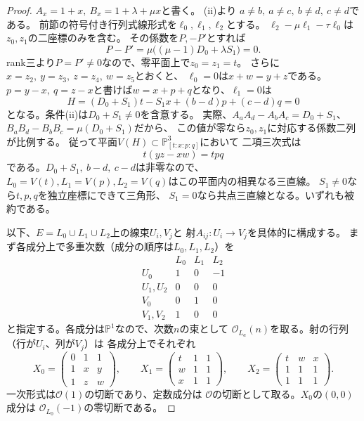 \begin{proof}
$A_x=1+x,\ B_x=1+\lambda+\mu x$と書く。
(ii)より
$a\ne b,\ a\ne c,\ b\ne d,\ c\ne d$である。
前節の符号付き行列式線形式を$\ell_0,\ell_1,\ell_2$とする。
$\ell_2-\mu\ell_1-\tau\ell_0$は$z_0,z_1$の二座標のみを含む。
その係数を$P,-P'$とすれば
\[
 P-P'=\mu\bigl((\mu-1)D_0+\lambda S_1\bigr)=0 .
\]
rank三より$P=P'\ne0$なので、零平面上で$z_0=z_1=t$。
さらに$x=z_2,\ y=z_3,\ z=z_4,\ w=z_5$とおくと、
$\ell_0=0$は$x+w=y+z$である。
$p=y-x,\ q=z-x$と書けば$w=x+p+q$となり、$\ell_1=0$は
\begin{equation}\label{eq:ou-dense-residual-plane}
 H=(D_0+S_1)t-S_1x+(b-d)p+(c-d)q=0
\end{equation}
となる。条件(ii)は$D_0+S_1\ne0$を含意する。
実際、$A_aA_d-A_bA_c=D_0+S_1$、
$B_aB_d-B_bB_c=\mu(D_0+S_1)$だから、
この値が零なら$z_0,z_1$に対応する係数二列が比例する。
従って平面$V(H)\subset\mathbb P^3_{[t:x:p:q]}$において
二項三次式は
\[
 t(yz-xw)=tpq
\]
である。$D_0+S_1,\ b-d,\ c-d$は非零なので、
$L_0=V(t),L_1=V(p),L_2=V(q)$はこの平面内の相異なる三直線。
$S_1\ne0$なら$t,p,q$を独立座標にできて三角形、
$S_1=0$なら共点三直線となる。いずれも被約である。

以下、$E=L_0\cup L_1\cup L_2$上の線束$U_i,V_j$と
射$A_{ij}:U_i\to V_j$を具体的に構成する。
まず各成分上で多重次数（成分の順序は$L_0,L_1,L_2$）を
\[
\begin{array}{c|ccc}
 &L_0&L_1&L_2\\ \hline
 U_0&1&0&-1\\
 U_1,U_2&0&0&0\\
 V_0&0&1&0\\
 V_1,V_2&1&0&0
\end{array}
\]
と指定する。各成分は$\mathbb P^1$なので、次数$n$の束として
$\mathcal O_{L_a}(n)$を取る。射の行列（行が$U_i$、列が$V_j$）は
各成分上でそれぞれ
\begin{equation}\label{eq:ou-dense-residual-component-matrices}
 X_0=\begin{pmatrix}0&1&1\\1&x&y\\1&z&w\end{pmatrix},\qquad
 X_1=\begin{pmatrix}t&1&1\\w&1&1\\x&1&1\end{pmatrix},\qquad
 X_2=\begin{pmatrix}t&w&x\\1&1&1\\1&1&1\end{pmatrix}.
\end{equation}
一次形式は$\mathcal O(1)$の切断であり、定数成分は
$\mathcal O$の切断として取る。$X_0$の$(0,0)$成分は
$\mathcal O_{L_0}(-1)$の零切断である。


\end{proof}
